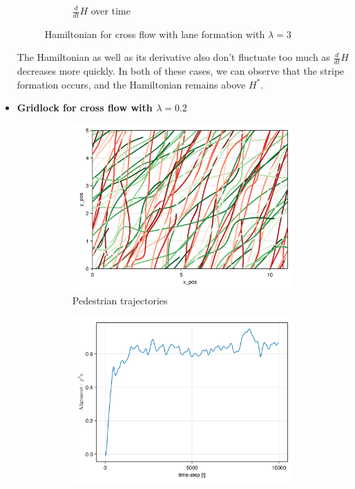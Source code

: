 \begin{itemize}
\begin{figure}[H]
\begin{subfigure}{.49\textwidth}
            \caption{$\frac{d}{dt}H$ over time}
            \label{plot:cross3_dh}
        \end{subfigure}
        \caption{Hamiltonian for cross flow with lane formation with $\lambda = 3$}
        \label{plot:cross3_hamiltonian}
    \end{figure}

The Hamiltonian as well as its derivative also don't fluctuate too much as $\frac{d}{dt}H$ decreases more quickly. In both of these cases, we can observe that the stripe formation occurs, and the Hamiltonian remains above $H^*$.

    \item \textbf{Gridlock for cross flow with $\lambda = 0.2$}
    \begin{figure}[H]
        \centering
        \begin{subfigure}{0.49\textwidth}
            \centering
            \includegraphics[width=\linewidth]{figures/ch5_collective/cross_gridlockdflow_4000.png}
            \caption{Pedestrian trajectories}
            \label{plot:crossgridlock_traj}
        \end{subfigure}
        \begin{subfigure}{.49\textwidth}
            \centering
            \includegraphics[width=\linewidth]{figures/ch5_collective/straight_gridlock_cross.png}

\end{subfigure}
\end{figure}
\end{itemize}
